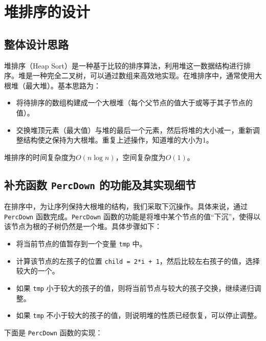 \documentclass[UTF8]{ctexart}
\begin{document}
\pagestyle{fancy}
\fancyhead{}

\section{堆排序的设计}
\subsection{整体设计思路}
堆排序（Heap Sort）是一种基于比较的排序算法，利用堆这一数据结构进行排序。堆是一种完全二叉树，可以通过数组来高效地实现。在堆排序中，通常使用大根堆（最大堆）。基本思路为：

\begin{itemize}
    \item 将待排序的数组构建成一个大根堆（每个父节点的值大于或等于其子节点的值）。
    \item 交换堆顶元素（最大值）与堆的最后一个元素，然后将堆的大小减一，重新调整结构使之保持为大根堆。重复上述操作，知道堆的大小为1。
\end{itemize}

堆排序的时间复杂度为$O(n \log n)$，空间复杂度为$O(1)$。

\subsection{补充函数 \texttt{PercDown} 的功能及其实现细节}
在排序中，为让序列保持大根堆的结构，我们采取下沉操作。具体来说，通过 \texttt{PercDown} 函数完成。\texttt{PercDown} 函数的功能是将堆中某个节点的值“下沉”，使得以该节点为根的子树仍然是一个堆。具体步骤如下：

\begin{itemize}
    \item 将当前节点的值暂存到一个变量 \texttt{tmp} 中。
    \item 计算该节点的左孩子的位置 \texttt{child = 2*i + 1}，然后比较左右孩子的值，选择较大的一个。
    \item 如果 \texttt{tmp} 小于较大的孩子的值，则将当前节点与较大的孩子交换，继续递归调整。
    \item 如果 \texttt{tmp} 不小于较大的孩子的值，则说明堆的性质已经恢复，可以停止调整。
\end{itemize}

下面是 \texttt{PercDown} 函数的实现：
\end{document}
